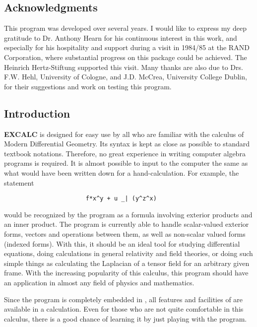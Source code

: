 

\subsection*{Acknowledgments}

This program was developed over several years. I would like to express
my deep gratitude to Dr. Anthony Hearn for his continuous interest in
this work, and especially for his hospitality and support during a
visit in 1984/85 at the RAND Corporation, where substantial progress
on this package could be achieved. The Heinrich Hertz-Stiftung
supported this visit. Many thanks are also due to Drs. F.W. Hehl,
University of Cologne, and J.D. McCrea, University College Dublin, for
their suggestions and work on testing this program.

\subsection{Introduction}

{\bf EXCALC} is designed for easy use by all who are familiar with the
calculus of Modern Differential Geometry.  Its syntax is kept as close
as possible to standard textbook notations.  Therefore, no great
experience in writing computer algebra programs is required.  It is
almost possible to input to the computer the same as what would have
been written down for a hand-calculation.  For example, the statement
\begin{verbatim}
                       f*x^y + u _| (y^z^x)
\end{verbatim}
would be recognized by the program as a formula involving exterior
products and an inner product.  The program is currently able to
handle scalar-valued exterior forms, vectors and operations between
them, as well as non-scalar valued forms (indexed forms).  With this,
it should be an ideal tool for studying differential equations,
doing calculations in general relativity and field theories, or doing
such simple things as calculating the Laplacian of a tensor field for
an arbitrary given frame.  With the increasing popularity of this
calculus, this program should have an application in almost any field
of physics and mathematics.

Since the program is completely embedded in {\REDUCE}, all features and
facilities of {\REDUCE} are available in a calculation.  Even for those
who are not quite comfortable in this calculus, there is a good chance
of learning it by just playing with the program.

